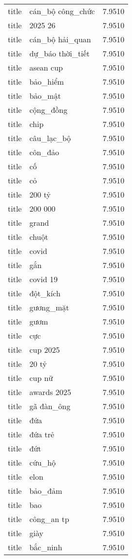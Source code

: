 \documentclass{article}
\begin{document}
\begin{tabular}{lll}
title & cán\_bộ công\_chức & 7.9510\\
title & 2025 26 & 7.9510\\
title & cán\_bộ hải\_quan & 7.9510\\
title & dự\_báo thời\_tiết & 7.9510\\
title & asean cup & 7.9510\\
title & bảo\_hiểm & 7.9510\\
title & bảo\_mật & 7.9510\\
title & cộng\_đồng & 7.9510\\
title & chip & 7.9510\\
title & câu\_lạc\_bộ & 7.9510\\
title & côn\_đảo & 7.9510\\
title & cố & 7.9510\\
title & cỏ & 7.9510\\
title & 200 tỷ & 7.9510\\
title & 200 000 & 7.9510\\
title & grand & 7.9510\\
title & chuột & 7.9510\\
title & covid & 7.9510\\
title & gắn & 7.9510\\
title & covid 19 & 7.9510\\
title & đột\_kích & 7.9510\\
title & gương\_mặt & 7.9510\\
title & gươm & 7.9510\\
title & cực & 7.9510\\
title & cup 2025 & 7.9510\\
title & 20 tỷ & 7.9510\\
title & cup nữ & 7.9510\\
title & awards 2025 & 7.9510\\
title & gã đàn\_ông & 7.9510\\
title & đứa & 7.9510\\
title & đứa trẻ & 7.9510\\
title & đứt & 7.9510\\
title & cứu\_hộ & 7.9510\\
title & elon & 7.9510\\
title & bảo\_đảm & 7.9510\\
title & bao & 7.9510\\
title & công\_an tp & 7.9510\\
title & giày & 7.9510\\
title & bắc\_ninh & 7.9510\\

\end{tabular}
\end{document}
